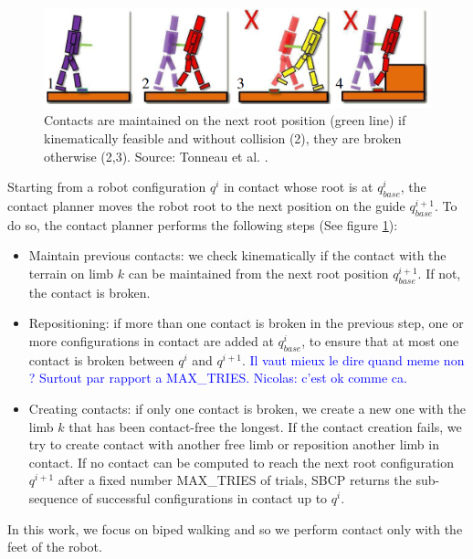 \begin{figure}
    \centering
    \includegraphics[width=\textwidth]{Figures/Chapter_CPSB/contact_maintain.png}
    \caption{Contacts are maintained on the next root position (green line) if kinematically feasible and without collision (2), they are broken otherwise (2,3). Source: Tonneau et al. \cite{AcyclicCP}.}
    \label{fig:overview_sbcp}
\end{figure}

Starting from a robot configuration $q^i$ in contact whose root is at $q_{base}^i$, the contact planner moves the robot root to the next position on the guide $q_{base}^{i+1}$. To do so, the contact planner performs the following steps (See figure \ref{fig:overview_sbcp}):
\begin{itemize}
    \item Maintain previous contacts: we check kinematically if the contact with the terrain on limb $k$ can be maintained from the next root position $q_{base}^{i+1}$. If not, the contact is broken.
    \item Repositioning: if more than one contact is broken in the previous step, one or more configurations in contact are added at $q_{base}^i$, to ensure that at most one contact is broken between $q^i$ and $q^{i+1}$.  \textcolor{blue}{Il vaut mieux le dire quand meme non ? Surtout par rapport a MAX\_TRIES. Nicolas: c'est ok comme ca.}
    \item Creating contacts: if only one contact is broken, we create a new one with the limb $k$ that has been contact-free the longest. If the contact creation fails, we try to create contact with another free limb or reposition another limb in contact. If no contact can be computed to reach the next root configuration $q^{i+1}$ after a fixed number MAX\_TRIES of trials, SBCP returns the sub-sequence of successful configurations in contact up to $q^i$.
\end{itemize}
In this work, we focus on biped walking and so we perform contact only with the feet of the robot.
